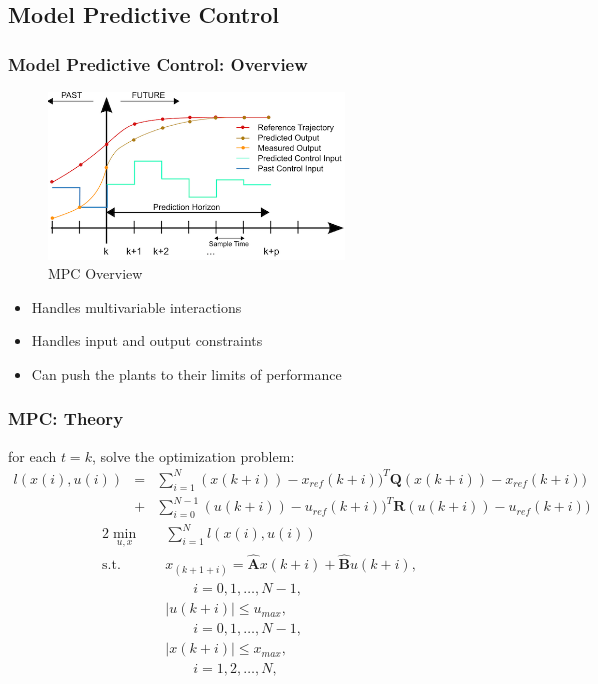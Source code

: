 \documentclass{beamer}
\begin{document}
\subsection{Model Predictive Control}
\begin{frame}
  \frametitle{Model Predictive Control: Overview}
  \begin{figure}
    \includegraphics[width = 0.7\textwidth]{fig/MPC.png}
    \caption{MPC Overview}
  \end{figure}
  \vspace{-0.5cm}
  \begin{itemize}
    \item Handles multivariable interactions
    \item Handles input and output constraints
    \item Can push the plants to their limits of performance
  \end{itemize}
\end{frame}

\begin{frame}
  \frametitle{MPC: Theory}
  for each $t = k$, solve the optimization problem:
  \small
  \begin{eqnarray}
    l(x(i),u(i)) &=& \sum\limits_{i = 1}^N(x(k+i))-x_{ref}(k+i))^T\mathbf{Q}(x(k+i))-x_{ref}(k+i)) \nonumber \\
    &+&\sum\limits_{i = 0}^{N-1}(u(k+i))-u_{ref}(k+i))^T\mathbf{R}(u(k+i))-u_{ref}(k+i)) \nonumber
\end{eqnarray}
\vspace{-0.5cm}
\begin{alignat}{2}
    \min_{u,x} \quad &\sum\limits_{i=1}^N l(x(i),u(i)) \\
    \mbox{s.t.}\quad
    &x_{(k+1+i)}= \mathbf{\hat{A}}x(k+i) + \mathbf{\hat{B}}u(k+i), \nonumber\\
    &\quad \quad i=0,1,\dots,N-1,\label{con:model} \\
    &|u(k+i)| \leq u_{max}, \nonumber\\
    &\quad \quad i=0,1,\dots,N-1 \label{con:input}, \\
    &|x(k+i)| \leq x_{max}, \nonumber\label{con:state}\\
    &\quad \quad i=1,2,\dots,N,
\end{alignat}

\end{frame}
\end{document}
